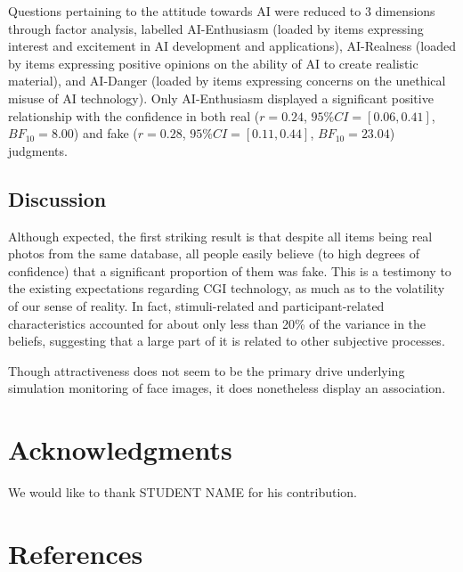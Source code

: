 \documentclass[
  man,floatsintext]{apa6}
\begin{document}
Questions pertaining to the attitude towards AI were reduced to 3 dimensions through factor analysis, labelled AI-Enthusiasm (loaded by items expressing interest and excitement in AI development and applications), AI-Realness (loaded by items expressing positive opinions on the ability of AI to create realistic material), and AI-Danger (loaded by items expressing concerns on the unethical misuse of AI technology). Only AI-Enthusiasm displayed a significant positive relationship with the confidence in both real (\(r = 0.24\), \(95\% CI = [0.06, 0.41]\), \(BF_{10} = 8.00\)) and fake (\(r = 0.28\), \(95\% CI = [0.11, 0.44]\), \(BF_{10} = 23.04\)) judgments.

\hypertarget{discussion}{%
\subsection{Discussion}\label{discussion}}

Although expected, the first striking result is that despite all items being real photos from the same database, all people easily believe (to high degrees of confidence) that a significant proportion of them was fake. This is a testimony to the existing expectations regarding CGI technology, as much as to the volatility of our sense of reality. In fact, stimuli-related and participant-related characteristics accounted for about only less than 20\% of the variance in the beliefs, suggesting that a large part of it is related to other subjective processes.

Though attractiveness does not seem to be the primary drive underlying simulation monitoring of face images, it does nonetheless display an association.

\hypertarget{acknowledgments}{%
\section{Acknowledgments}\label{acknowledgments}}

We would like to thank STUDENT NAME for his contribution.

\newpage

\hypertarget{references}{%
\section{References}\label{references}}
\end{document}
